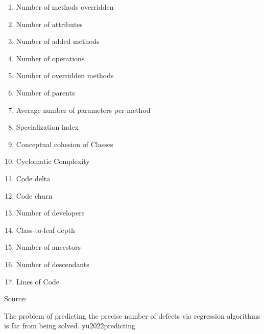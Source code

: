 \documentclass{article}
\begin{document}
{\begin{pptWide}{5}
\begin{enumerate}
\item \textbf{} Number of methods overridden
\item \textbf{} Number of attributes
\item \textbf{} Number of added methods
\item \textbf{} Number of operations
\item \textbf{} Number of overridden methods
\item \textbf{} Number of parents
\item \textbf{} Average number of parameters per method
\item \textbf{} Specialization index
\item \textbf{} Conceptual cohesion of Classes
\item \textbf{} Cyclomatic Complexity
\item \textbf{} Code delta
\item \textbf{} Code churn
\item \textbf{} Number of developers
\item \textbf{} Class-to-leaf depth
\item \textbf{} Number of ancestors
\item \textbf{} Number of descendants
\item \textbf{} Lines of Code
\end{enumerate}
\end{pptWide}
\par
{\scriptsize Source: \par}}

  {The problem of predicting the precise number of defects via regression algorithms is far from being solved.}
  {yu2022predicting}
\end{document}

